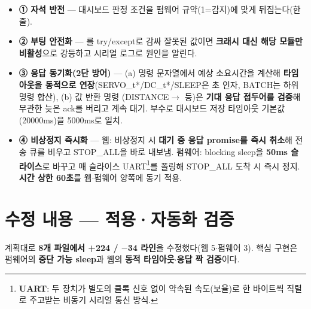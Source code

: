 \begin{itemize}
  \item \textbf{① 자석 반전} — 대시보드 판정 조건을 펌웨어 규약(1=감지)에 맞게 뒤집는다(한 줄).
  \item \textbf{② 부팅 안전화} — 를 try/except로 감싸 잘못된 값이면
  \textbf{크래시 대신 해당 모듈만 비활성}으로 강등하고 시리얼 로그로 원인을 알린다.
  \item \textbf{③ 응답 동기화(2단 방어)} — (a) 명령 문자열에서 예상 소요시간을 계산해 \textbf{타임아웃을
  동적으로 연장}(SERVO\_t*/DC\_t*/SLEEP은 초 인자, BATCH는 하위 명령 합산), (b) 값 반환 명령
  (DISTANCE$\to$ 등)은 \textbf{기대 응답 접두어를 검증}해 무관한 늦은 ack를 버리고 계속
  대기. 부수로 대시보드 저장 타임아웃 기본값(20000ms)을 5000ms로 일치.
  \item \textbf{④ 비상정지 즉시화} — 웹: 비상정지 시 \textbf{대기 중 응답 promise를 즉시 취소}해
  전송 큐를 비우고 STOP\_ALL을 바로 내보냄. 펌웨어: blocking sleep을 \textbf{50ms 슬라이스}로
  바꾸고 매 슬라이스 UART\footnote{\textbf{UART}: 두 장치가 별도의 클록 신호 없이 약속된 속도(보율)로 한 바이트씩 직렬로 주고받는 비동기 시리얼 통신 방식.}를 폴링해 STOP\_ALL 도착 시 즉시 정지. \textbf{시간 상한 60초}를
  웹$\cdot$펌웨어 양쪽에 동기 적용.
\end{itemize}

\section{수정 내용 — 적용·자동화 검증}
계획대로 \textbf{8개 파일에서 +224 / $-$34 라인}을 수정했다(웹 5$\cdot$펌웨어 3). 핵심 구현은
펌웨어의 \textbf{중단 가능 sleep}과 웹의 \textbf{동적 타임아웃$\cdot$응답 짝 검증}이다.

\smallskip
{}

